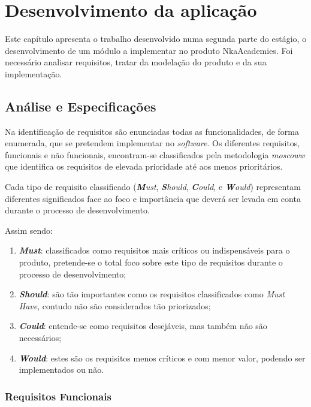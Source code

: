 
\chapter{Desenvolvimento da aplicação}
\label{desenv}
Este capítulo apresenta o trabalho desenvolvido numa segunda parte do estágio, o desenvolvimento de um módulo a implementar no produto NkaAcademies. Foi necessário analisar requisitos, tratar da modelação do produto e da sua implementação.

\section{Análise e Especificações}

Na identificação de requisitos são enunciadas todas as funcionalidades, de forma enumerada, que se pretendem implementar no \textit{software}.
Os diferentes requisitos, funcionais e não funcionais, encontram-se classificados pela metodologia \textit{\gls{moscoww}} que identifica os requisitos de elevada prioridade até aos menos prioritários.

Cada tipo de requisito classificado (\textit{\textbf{M}ust}, \textit{\textbf{S}hould}, \textit{\textbf{C}ould}, e \textit{\textbf{W}ould}) representam diferentes significados face ao foco e importância que deverá ser levada em conta durante o processo de desenvolvimento.

Assim sendo:


\begin{enumerate}
  \item \textbf{\textit{Must}}: classificados como requisitos mais críticos ou indispensáveis para o produto, pretende-se o total foco sobre este tipo de requisitos durante o processo de desenvolvimento;
  \item \textbf{\textit{Should}}: são tão importantes como os requisitos classificados como \textit{Must Have}, contudo não são considerados tão priorizados;
  \item \textbf{\textit{Could}}: entende-se como requisitos desejáveis, mas também não são necessários;
  \item \textbf{\textit{Would}}: estes são os requisitos menos críticos e com menor valor, podendo ser implementados ou não.
\end{enumerate}

\subsection{Requisitos Funcionais}

